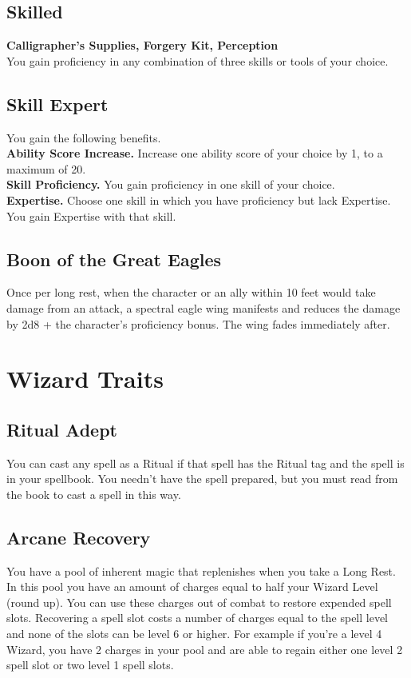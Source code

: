 \documentclass[letterpaper,openany,oneside,twocolumn]{book}
\begin{document}
\subsection*{Skilled}
\textbf{Calligrapher's Supplies, Forgery Kit, Perception}\\
You gain proficiency in any combination of three skills or tools of your choice. 

\subsection*{Skill Expert}
You gain the following benefits.\\
\textbf{Ability Score Increase.} Increase one ability score of your choice by 1, to a maximum of 20.\\
\textbf{Skill Proficiency.} You gain proficiency in one skill of your choice.\\
\textbf{Expertise.} Choose one skill in which you have proficiency but lack Expertise. You gain Expertise with that skill.

\subsection*{Boon of the Great Eagles}
Once per long rest, when the character or an ally within 10 feet would take damage from an attack, a spectral eagle wing manifests and reduces the damage by 2d8 + the character's proficiency bonus.
The wing fades immediately after.


\section*{Wizard Traits}
\subsection*{Ritual Adept}
You can cast any spell as a Ritual if that spell has the Ritual tag and the spell is in your spellbook. You needn't have the spell prepared, but you must read from the book to cast a spell in this way. 
\subsection*{Arcane Recovery}
You have a pool of inherent magic that replenishes when you take a Long Rest. In this pool you have an amount of charges equal to half your Wizard Level (round up). You can use these charges out of combat to restore expended spell slots. Recovering a spell slot costs a number of charges equal to the spell level and none of the slots can be level 6 or higher. For example if you're a level 4 Wizard, you have 2 charges in your pool and are able to regain either one level 2 spell slot or two level 1 spell slots. 
\end{document}
